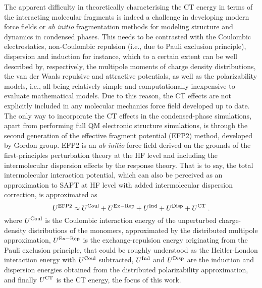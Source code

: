 The apparent difficulty in theoretically characterising the CT energy
in terms of the interacting molecular fragments
is indeed a challenge in developing modern force fields 
or \emph{ab initio} fragmentation methods\cite{Gordon.Fedorov.Pruitt.Slipchenko.ChemRev.2012}
for modeling structure
and dynamics in condensed phases.
This needs to be contrasted with the Coulombic electrostatics,
non\hyp{}Coulombic repulsion (i.e., due to Pauli exclusion principle), 
dispersion and induction for instance, 
which to a certain extent
can be well described by, respectively, 
the multipole moments of charge density distributions,\cite{Sokalski.Poirier.CPL.1983,
Etchebest.Lavery.Pullman.TheorChimActa.1982,Stone.JCTC.2005}
the van der Waals repulsive and attractive potentials, 
as well as the polarizability models, i.e., all being relatively simple and computationally
inexpensive to evaluate mathematical models. 
Due to this reason, the CT effects 
are not explicitly included in any molecular mechanics force field developed up to date.
The only way to
incorporate the CT effects in the condensed\hyp{}phase simulations,
apart from performing full QM electronic structure simulations,
is through the second generation of the effective fragment potential 
(EFP2) method,\cite{Gordon.Smith.Xu.Slipchenko.AnnuRevPhysChem.2013,
   Nguyen.Pachter.Day.JCP.2014,
   Day.Jensen.Gordon.Webb.Stevens.Krauss.Garmer.Basch.Cohen.JCP.1996}
developed by Gordon group.\cite{Li.Gordon.Jensen.JCP.2006,Xu.Gordon.JCP.2013}
EFP2 is an \emph{ab initio} force field
derived on the grounds of the first\hyp{}principles perturbation theory
at the HF level and including the intermolecular dispersion effects
by the response theory. 
That is to say, the total intermolecular 
interaction potential, which can also be perceived as an approximation
to SAPT at HF level with added intermolecular dispersion correction, is approximated as 
%
\begin{equation}\label{e:u-efp2}
 U^{\rm EFP2} \approx U^{\rm Coul} + U^{\rm Ex-Rep} + U^{\rm Ind} + U^{\rm Disp} + U^{\rm CT} \;.
\end{equation}
%
where $U^{\rm Coul}$ is the Coulombic interaction energy of the unperturbed charge\hyp{}density
distributions of the monomers, approximated by the distributed multipole approximation,
$U^{\rm Ex-Rep}$ is the exchange\hyp{}repulsion energy originating from the Pauli exclusion
principle, that could be roughly understood as the Heitler\hyp{}London interaction
energy with $U^{\rm Coul}$ subtracted, $U^{\rm Ind}$ and $U^{\rm Disp}$
are the induction and dispersion energies obtained from the distributed polarizability
approximation, and finally $U^{\rm CT}$ is the CT energy, the focus of this work.

